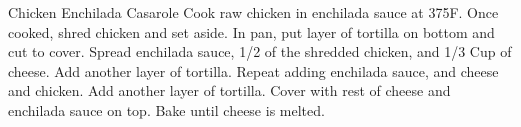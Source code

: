 \documentclass[../cookbook.tex]{subfiles}
\begin{document}
\begin{recipe}{Chicken Enchilada Casarole}{}{}
    Cook raw chicken in enchilada sauce at 375\degrees{}F. Once cooked, shred chicken and set aside.
    In pan, put layer of tortilla on bottom and cut to cover.
    Spread enchilada sauce, 1/2 of the shredded chicken, and 1/3 Cup of cheese. Add another layer of tortilla.
    Repeat adding enchilada sauce, and cheese and chicken. Add another layer of tortilla. Cover with rest of
    cheese and enchilada sauce on top. Bake until cheese is melted.
    
\end{recipe}
\end{document}
